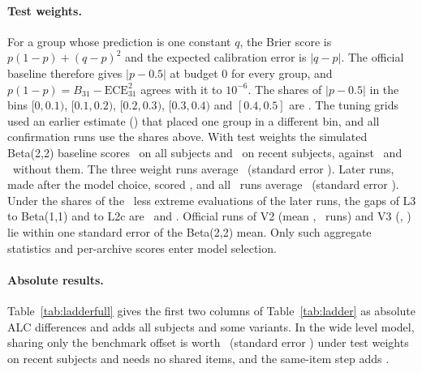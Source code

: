 \documentclass{article}
\begin{document}
\paragraph{Test weights.} For a group whose prediction is one constant $q$, the Brier score is $p(1-p)+(q-p)^2$ and the expected calibration error is $|q-p|$. The official baseline therefore gives $|p-0.5|$ at budget 0 for every group, and $p(1-p)=B_{31}-\mathrm{ECE}_{31}^2$ agrees with it to $10^{-6}$. The shares of $|p-0.5|$ in the bins $[0,0.1)$, $[0.1,0.2)$, $[0.2,0.3)$, $[0.3,0.4)$ and $[0.4,0.5]$ are \TpShareOwn. The tuning grids used an earlier estimate (\TpShareSim) that placed one group in a different bin, and all confirmation runs use the shares above. With test weights the simulated Beta(2,2) baseline scores \SimBtwoACO\ on all subjects and \SimBtwoRCO\ on recent subjects, against \SimBtwoACU\ and \SimBtwoRCU\ without them. The three weight runs average \OffBetaMean\ (standard error \OffBetaSe). Later runs, made after the model choice, scored \OffBetaLaterRuns, and all \OffBetaAllN\ runs average \OffBetaAllMean\ (standard error \OffBetaAllSe). Under the shares of the \TpLaterGroups\ less extreme evaluations of the later runs, the gaps of L3 to Beta(1,1) and to L2c are \ShLaterRCLthreeBeta\ and \ShLaterRCLthreeLtwoc. Official runs of V2 (mean \OffVtwoMean, \OffVtwoN\ runs) and V3 (\OffVthreeMean, \OffVthreeN) lie within one standard error of the Beta(2,2) mean. Only such aggregate statistics and per-archive scores enter model selection.

\paragraph{Absolute results.} Table~\ref{tab:ladderfull} gives the first two columns of Table~\ref{tab:ladder} as absolute ALC differences and adds all subjects and some variants. In the wide level model, sharing only the benchmark offset is worth \PairRCLevelShareOAbs\ (standard error \PairRCLevelShareOSe) under test weights on recent subjects and needs no shared items, and the same-item step adds \PairRCExactStepOAbs.
\end{document}
